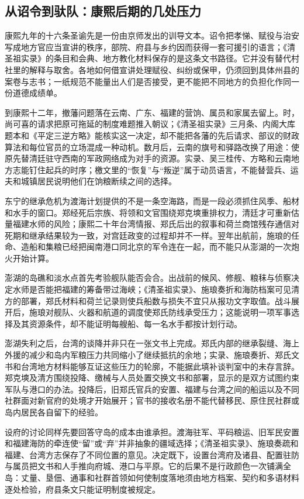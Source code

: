 \subsection*{从诏令到驮队：康熙后期的几处压力}

康熙九年的十六条圣谕先是一份由京师发出的训导文本。诏令把孝悌、赋役与治安写成地方官应当宣讲的秩序，部院、府县与乡约因而获得一套可援引的语言；《清圣祖实录》的条目和会典、地方教化材料保存的是这条文书路径。它并没有替代村社里的解释与取舍。各地如何借宣讲处理赋役、纠纷或保甲，仍须回到具体州县的案卷与志书；一纸规范不能量出人们是否接受，更不能把不同地方的负担化作同一份道德成绩单。

到康熙十二年，撤藩问题落在云南、广东、福建的营饷、属员和家属去留上。时，尚可喜的请求把原可拖延的制度难题推入朝议；《清圣祖实录》三月条、内阁大库题本和《平定三逆方略》能核实这一决定，却不能把各藩的先后请求、部议的财政算法和每位官员的立场混成一种动机。数月后，云南的旗号和驿路改换了用途：使原先替清廷驻守西南的军政网络成为对手的资源。实录、吴三桂传、方略和云南地方志能钉住起兵的时序；檄文里的“恢复”与“叛逆”属于动员语言，不能替营兵、运夫和城镇居民说明他们在饷粮断续之间的选择。

东宁的继承危机为渡海计划提供的不是一条空海路，而是一段必须抓住风季、船材和水手的窗口。郑经死后宗族、将领和文官围绕郑克塽重排权力，清廷才可重新估量福建水师的风险；康熙二十年台湾情报、郑氏后出的叙事和荷兰商馆残存通信对死期和继承结果较为一致，对宫廷政变的过程却并不一样。翌年出航前，施琅的任命、造船和集粮已经把闽南港口同北京的军令连在一起，而不能只从澎湖的一次炮火开始计算。

澎湖的岛礁和淡水点首先考验舰队能否会合。出战前的候风、修舰、粮秣与侦察决定水师是否能把福建的筹备带过海峡；《清圣祖实录》、施琅奏折和海防档案可见清方的部署，郑氏材料和荷兰记录则使兵船数与损失不宜只从报功文字取值。战斗展开后，施琅对舰队、火器和航道的调度使郑氏防线承受压力；这能说明一项军事选择及其资源条件，却不能证明每艘船、每一名水手都按计划行动。

澎湖失利之后，台湾的谈降并非只在一张文书上完成。郑氏内部的继承裂缝、海上外援的减少和岛内军粮压力共同缩小了继续抵抗的余地；实录、施琅奏折、郑氏文书和台湾地方材料能够互证这些压力的轮廓，不能据此填补谈判室中的未存言辞。郑克塽及清方围绕投降、缴械与人员处置交换文书和部署，显示的是双方试图约束军队与港口的办法。投降后，旧郑氏官兵的安置、福建与台湾之间的船运以及不同社群面对新官府的处境才开始展开；官书的接收名册不能代替移民、原住民社群或岛内居民各自留下的经验。

设府的讨论同样先要回答守岛的成本由谁承担。渡海驻军、平码粮运、旧军民安置和福建海防的牵连使“留”或“弃”并非抽象的疆域选择；《清圣祖实录》、施琅奏疏和福建、台湾方志保存了不同位置的意见。决定既下，设置台湾府及诸县、配置驻防与属员把文书和人手推向府城、港口与平原。它的后果不是行政颜色一次铺满全岛：丈量、垦佃、通事和社群首领如何使制度落地须由地方档案、契约和多语材料逐处检验，府县条文只能证明制度被规定。

